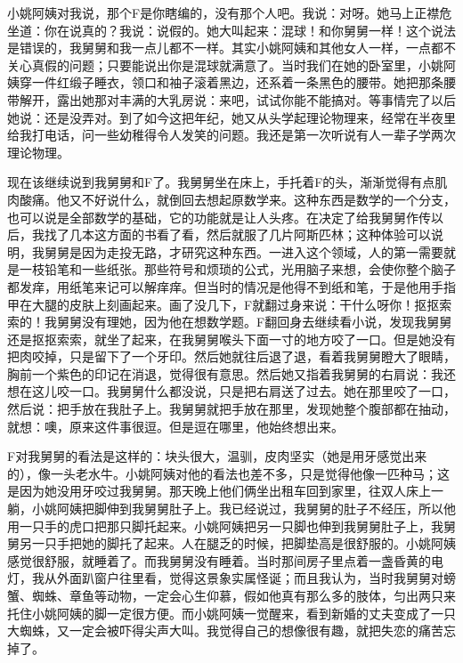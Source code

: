 小姚阿姨对我说，那个F是你瞎编的，没有那个人吧。我说：对呀。她马上正襟危坐道：你在说真的？我说：说假的。她大叫起来：混球！和你舅舅一样！这个说法是错误的，我舅舅和我一点儿都不一样。其实小姚阿姨和其他女人一样，一点都不关心真假的问题；只要能说出你是混球就满意了。当时我们在她的卧室里，小姚阿姨穿一件红缎子睡衣，领口和袖子滚着黑边，还系着一条黑色的腰带。她把那条腰带解开，露出她那对丰满的大乳房说：来吧，试试你能不能搞对。等事情完了以后她说：还是没弄对。到了如今这把年纪，她又从头学起理论物理来，经常在半夜里给我打电话，问一些幼稚得令人发笑的问题。我还是第一次听说有人一辈子学两次理论物理。 

现在该继续说到我舅舅和F了。我舅舅坐在床上，手托着F的头，渐渐觉得有点肌肉酸痛。他又不好说什么，就倒回去想起原数学来。这种东西是数学的一个分支，也可以说是全部数学的基础，它的功能就是让人头疼。在决定了给我舅舅作传以后，我找了几本这方面的书看了看，然后就服了几片阿斯匹林；这种体验可以说明，我舅舅是因为走投无路，才研究这种东西。一进入这个领域，人的第一需要就是一枝铅笔和一些纸张。那些符号和烦琐的公式，光用脑子来想，会使你整个脑子都发痒，用纸笔来记可以解痒痒。但当时的情况是他得不到纸和笔，于是他用手指甲在大腿的皮肤上刻画起来。画了没几下，F就翻过身来说：干什么呀你！抠抠索索的！我舅舅没有理她，因为他在想数学题。F翻回身去继续看小说，发现我舅舅还是抠抠索索，就坐了起来，在我舅舅喉头下面一寸的地方咬了一口。但是她没有把肉咬掉，只是留下了一个牙印。然后她就往后退了退，看着我舅舅瞪大了眼睛，胸前一个紫色的印记在消退，觉得很有意思。然后她又指着我舅舅的右肩说：我还想在这儿咬一口。我舅舅什么都没说，只是把右肩送了过去。她在那里咬了一口，然后说：把手放在我肚子上。我舅舅就把手放在那里，发现她整个腹部都在抽动，就想：噢，原来这件事很逗。但是逗在哪里，他始终想出来。 

F对我舅舅的看法是这样的：块头很大，温驯，皮肉坚实（她是用牙感觉出来的），像一头老水牛。小姚阿姨对他的看法也差不多，只是觉得他像一匹种马；这是因为她没用牙咬过我舅舅。那天晚上他们俩坐出租车回到家里，往双人床上一躺，小姚阿姨把脚伸到我舅舅肚子上。我已经说过，我舅舅的肚子不经压，所以他用一只手的虎口把那只脚托起来。小姚阿姨把另一只脚也伸到我舅舅肚子上，我舅舅另一只手把她的脚托了起来。人在腿乏的时候，把脚垫高是很舒服的。小姚阿姨感觉很舒服，就睡着了。而我舅舅没有睡着。当时那间房子里点着一盏昏黄的电灯，我从外面趴窗户往里看，觉得这景象实属怪诞；而且我认为，当时我舅舅对螃蟹、蜘蛛、章鱼等动物，一定会心生仰慕，假如他真有那么多的肢体，匀出两只来托住小姚阿姨的脚一定很方便。而小姚阿姨一觉醒来，看到新婚的丈夫变成了一只大蜘蛛，又一定会被吓得尖声大叫。我觉得自己的想像很有趣，就把失恋的痛苦忘掉了。 

